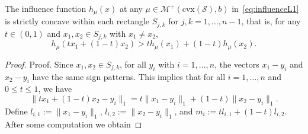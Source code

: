 \documentclass[stsy,sglanonrev]{informs4}
\newcommand{\death}{{\beta}}
\begin{document}
\begin{lemma}\label{lemma:piecewiseConcave}
    The influence function \(h_{\mu}(x)\) at any $\mu\in\mathcal{M}^+(\mathrm{cvx}(\mathcal{S}), b)$ in~\eqref{eq:influenceL1} is strictly concave within each rectangle \(S_{j,k}\) for \(j, k = 1, \dots, n-1\), that is, for any $t \in (0, 1)$ and \(x_1, x_2 \in S_{j,k}\) with $x_1 \ne x_2$,
    \begin{equation}
        h_{\mu}(t x_1 + (1-t)x_2) > t h_{\mu}(x_1) + (1-t)h_{\mu}(x_2).
    \end{equation}
\end{lemma}
\begin{proof}{Proof.} 
Since \( x_1, x_2 \in S_{j,k} \), for all \( y_i \) with \( i=1,\dots,n \), the vectors \( x_1 - y_i \) and \( x_2 - y_i \) have the same sign patterns. This implies that for all \( i=1,\dots,n \) and \( 0 \leq t \leq 1 \), we have
\[
\| t x_1 + (1 - t) x_2 - y_i \|_1 = t \| x_1 - y_i \|_1 + (1 - t) \| x_2 - y_i \|_1.
\]
Define $l_{i,1} := \| x_1 - y_i \|_1$, $l_{i,2} := \| x_2 - y_i \|_1$, and $m_i := t l_{i,1} + (1 - t) l_{i,2}$. After some computation we obtain

\end{proof}
\end{document}
